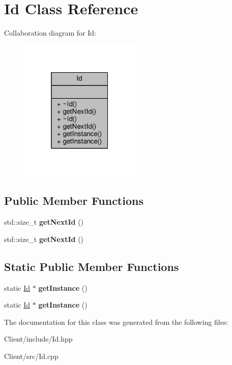 \hypertarget{class_id}{}\section{Id Class Reference}
\label{class_id}


Collaboration diagram for Id\+:\nopagebreak
\begin{figure}[H]
\begin{center}
\leavevmode
\includegraphics[width=163pt]{db/db1/class_id__coll__graph}
\end{center}
\end{figure}
\subsection*{Public Member Functions}
\begin{DoxyCompactItemize}
\item 
std\+::size\+\_\+t {\bfseries get\+Next\+Id} ()\hypertarget{class_id_a1c7239215ac516afe4e53aff92108162}{}\label{class_id_a1c7239215ac516afe4e53aff92108162}

\item 
std\+::size\+\_\+t {\bfseries get\+Next\+Id} ()\hypertarget{class_id_a1c7239215ac516afe4e53aff92108162}{}\label{class_id_a1c7239215ac516afe4e53aff92108162}

\end{DoxyCompactItemize}
\subsection*{Static Public Member Functions}
\begin{DoxyCompactItemize}
\item 
static \hyperlink{class_id}{Id} $\ast$ {\bfseries get\+Instance} ()\hypertarget{class_id_aa940dca775e95df77fd2e8f922bb33f1}{}\label{class_id_aa940dca775e95df77fd2e8f922bb33f1}

\item 
static \hyperlink{class_id}{Id} $\ast$ {\bfseries get\+Instance} ()\hypertarget{class_id_aa940dca775e95df77fd2e8f922bb33f1}{}\label{class_id_aa940dca775e95df77fd2e8f922bb33f1}

\end{DoxyCompactItemize}


The documentation for this class was generated from the following files\+:\begin{DoxyCompactItemize}
\item 
Client/include/Id.\+hpp\item 
Client/src/Id.\+cpp\end{DoxyCompactItemize}
